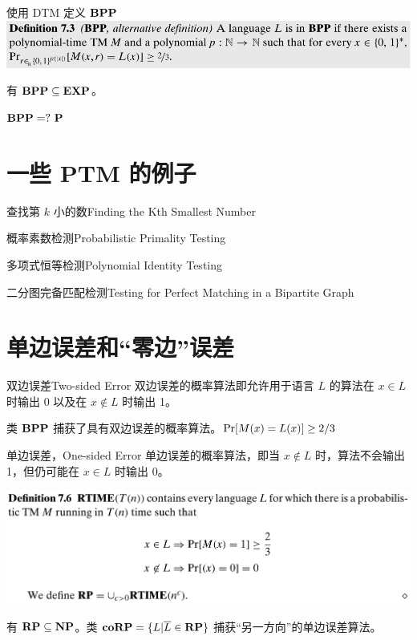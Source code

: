 \documentclass[UTF8,aspectratio=169,mathserif]{beamer}
\begin{document}
	\begin{frame}{使用 DTM 定义 $\bf BPP$}
		\includegraphics[width=\linewidth]{../../7/note.assets/image-20210508142316582.png}\newline
		
		有 $\bf BPP\subseteq EXP$。\newline
		
		${\bf BPP}=?\ {\bf P}$
	\end{frame}
	
	\section{一些 PTM 的例子}
	\begin{frame}{查找第 $k$ 小的数}{Finding the Kth Smallest
			Number}
	\end{frame}

	\begin{frame}{概率素数检测}{Probabilistic Primality Testing}
	\end{frame}
	
	\begin{frame}{多项式恒等检测}{Polynomial Identity Testing}
	\end{frame}

	\begin{frame}{二分图完备匹配检测}{Testing for Perfect Matching in a Bipartite Graph}
	\end{frame}
	
	\section{单边误差和“零边”误差}
	\begin{frame}{双边误差}{Two-sided Error}
		双边误差的概率算法即允许用于语言 $L$ 的算法在 $x\in L$ 时输出 0 以及在 $x\notin L$ 时输出 1。\newline
		
		类 $\bf BPP$ 捕获了具有双边误差的概率算法。${\rm Pr}[M(x)=L(x)]\ge 2/3$
	\end{frame}

	\begin{frame}{单边误差，One-sided Error}
		单边误差的概率算法，即当 $x\notin L$ 时，算法不会输出 1，但仍可能在 $x\in L$ 时输出 0。\newline
		
		\includegraphics[width=\linewidth]{../../7/note.assets/image-20210509133757822.png}\newline
		
		有 $\bf RP\subseteq NP$。类 ${\bf coRP}=\{L|\overline{L}\in{\bf RP}\}$ 捕获“另一方向”的单边误差算法。
	\end{frame}
\end{document}
